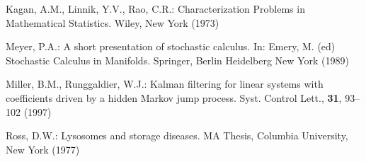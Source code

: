 %
%
%

%
% 
% 
%
\begin{thebibliography}{[KLR73]}
%
%
%
 Kagan, A.M., Linnik, Y.V., Rao, C.R.:
Characterization Problems in Mathematical Statistics. Wiley, New York (1973)

 Meyer, P.A.: A short presentation of
stochastic calculus. In: Emery, M. (ed) Stochastic Calculus in
Manifolds. Springer, Berlin Heidelberg New York (1989)

 Miller, B.M., Runggaldier, W.J.: Kalman
filtering for linear systems with coefficients driven by a hidden Markov
jump process. Syst. Control Lett., \textbf{31}, 93--102 (1997)

 Ross, D.W.: Lysosomes and storage diseases. MA
Thesis, Columbia University, New York (1977)


\end{thebibliography}
